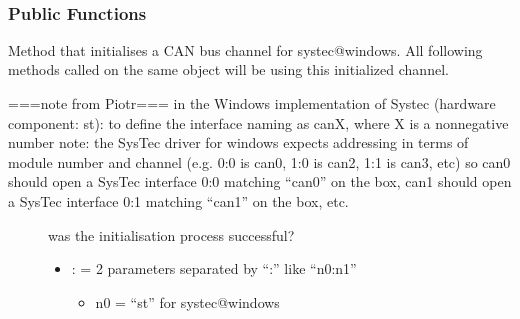 \documentclass[a4paper,10pt,english]{sphinxmanual}
\begin{document}
\begin{fulllineitems}
\label{\detokenize{vendors/systec:_CPPv49STCanScan}}%
\pysigstartmultiline
{}%
\pysigstopmultiline~\subsubsection*{Public Functions}

\begin{fulllineitems}
\label{\detokenize{vendors/systec:_CPPv4N9STCanScan9createBusEK6stringK6string}}%
\pysigstartmultiline
{}%
\pysigstopmultiline
Method that initialises a CAN bus channel for systec@windows. All following methods called on the same object will be using this initialized channel.


===note from Piotr=== in the Windows implementation of Systec (hardware component: st): to define the interface naming as canX, where X is a non\sphinxhyphen{}negative number note: the SysTec driver for windows expects addressing in terms of module number and channel (e.g. 0:0 is can0, 1:0 is can2, 1:1 is can3, etc) so can0 should open a SysTec interface 0:0 matching “can0” on the box, can1 should open a SysTec interface 0:1 matching “can1” on the box, etc.
\begin{description}
\item[{}] \leavevmode
was the initialisation process successful?

\item[{}] \leavevmode\begin{itemize}
\item {} 
: = 2 parameters separated by “:” like “n0:n1”\begin{itemize}
\item {} 
n0 = “st” for systec@windows


\end{itemize}
\end{itemize}
\end{description}
\end{fulllineitems}
\end{fulllineitems}
\end{document}
